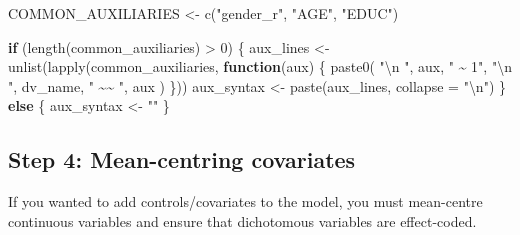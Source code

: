 \documentclass[
  letterpaper,
  DIV=11,
  numbers=noendperiod]{scrreprt}
\newenvironment{Shaded}{\begin{snugshade}}{\end{snugshade}}
\newcommand{\AttributeTok}[1]{\textcolor[rgb]{0.40,0.45,0.13}{#1}}
\newcommand{\ControlFlowTok}[1]{\textcolor[rgb]{0.00,0.23,0.31}{\textbf{#1}}}
\newcommand{\DecValTok}[1]{\textcolor[rgb]{0.68,0.00,0.00}{#1}}
\newcommand{\FunctionTok}[1]{\textcolor[rgb]{0.28,0.35,0.67}{#1}}
\newcommand{\NormalTok}[1]{\textcolor[rgb]{0.00,0.23,0.31}{#1}}
\newcommand{\OtherTok}[1]{\textcolor[rgb]{0.00,0.23,0.31}{#1}}
\newcommand{\SpecialCharTok}[1]{\textcolor[rgb]{0.37,0.37,0.37}{#1}}
\newcommand{\StringTok}[1]{\textcolor[rgb]{0.13,0.47,0.30}{#1}}
\begin{document}
\begin{Shaded}
\begin{Highlighting}[]
\NormalTok{COMMON\_AUXILIARIES }\OtherTok{\textless{}{-}} \FunctionTok{c}\NormalTok{(}\StringTok{"gender\_r"}\NormalTok{, }\StringTok{"AGE"}\NormalTok{, }\StringTok{"EDUC"}\NormalTok{)}

\ControlFlowTok{if}\NormalTok{ (}\FunctionTok{length}\NormalTok{(common\_auxiliaries) }\SpecialCharTok{\textgreater{}} \DecValTok{0}\NormalTok{) \{}
\NormalTok{  aux\_lines }\OtherTok{\textless{}{-}} \FunctionTok{unlist}\NormalTok{(}\FunctionTok{lapply}\NormalTok{(common\_auxiliaries, }\ControlFlowTok{function}\NormalTok{(aux) \{}
    \FunctionTok{paste0}\NormalTok{(}
      \StringTok{"}\SpecialCharTok{\textbackslash{}n}\StringTok{  "}\NormalTok{, aux, }\StringTok{" \textasciitilde{} 1"}\NormalTok{,}
      \StringTok{"}\SpecialCharTok{\textbackslash{}n}\StringTok{  "}\NormalTok{, dv\_name, }\StringTok{" \textasciitilde{}\textasciitilde{} "}\NormalTok{, aux}
\NormalTok{    )}
\NormalTok{  \}))}
\NormalTok{  aux\_syntax }\OtherTok{\textless{}{-}} \FunctionTok{paste}\NormalTok{(aux\_lines, }\AttributeTok{collapse =} \StringTok{"}\SpecialCharTok{\textbackslash{}n}\StringTok{"}\NormalTok{)}
\NormalTok{\} }\ControlFlowTok{else}\NormalTok{ \{}
\NormalTok{  aux\_syntax }\OtherTok{\textless{}{-}} \StringTok{""}
\NormalTok{\}}
\end{Highlighting}
\end{Shaded}

\subsection{Step 4: Mean-centring
covariates}\label{step-4-mean-centring-covariates}

If you wanted to add controls/covariates to the model, you must
mean-centre continuous variables and ensure that dichotomous variables
are effect-coded.
\end{document}

